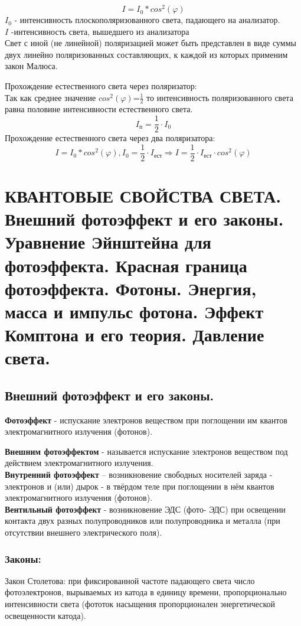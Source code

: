 \documentclass[12pt]{report}
\begin{document}
\[
    I=I_0*cos^2(\varphi)
\]
$I_0$ - интенсивность плоскополяризованного
света, падающего на анализатор.\\
$I$ -интенсивность света, вышедшего из
анализатора\\
Свет с иной (не линейной) поляризацией может быть
представлен в виде суммы двух линейно поляризованных
составляющих, к каждой из которых применим закон Малюса.

Прохождение естественного света через поляризатор:\\
Так как среднее значение $cos^2(\varphi)$=$\frac{1}{2}$ то интенсивность поляризованного света равна половине интенсивности естественного света.
\[
    I_\text{п}=\frac{1}{2} \cdot I_0
\]
Прохождение естественного света через два поляризатора:\\
\[
    I=I_0*cos^2(\varphi), I_0=\frac{1}{2}\cdot I_\text{ест} \Rightarrow{} I=\frac{1}{2}\cdot I_\text{ест} \cdot cos^2(\varphi)
\]
\section{КВАНТОВЫЕ СВОЙСТВА СВЕТА. Внешний фотоэффект и его законы. Уравнение Эйнштейна для фотоэффекта. Красная граница фотоэффекта. Фотоны. Энергия, масса и импульс фотона. Эффект Комптона и его теория. Давление света.}
\subsection{ Внешний фотоэффект и его законы.}
\textbf{Фотоэффект} - испускание электронов веществом при поглощении им квантов электромагнитного излучения (фотонов).

\textbf{Внешним фотоэффектом} - называется испускание
электронов веществом под действием электромагнитного
излучения.\\

\textbf{Внутренний фотоэффект} – возникновение свободных
носителей заряда - электронов и (или) дырок - в твёрдом
теле при поглощении в нём квантов электромагнитного
излучения (фотонов).\\

\textbf{Вентильный фотоэффект} - возникновение ЭДС (фото-
ЭДС) при освещении контакта двух разных полупроводников или полупроводника и металла (при отсутствии внешнего электрического поля).

\subsubsection{Законы:}
Закон Столетова: при фиксированной частоте падающего света число фотоэлектронов, вырываемых из катода в единицу времени, пропорционально интенсивности света (фототок насыщения пропорционален энергетической освещенности катода).
\end{document}
